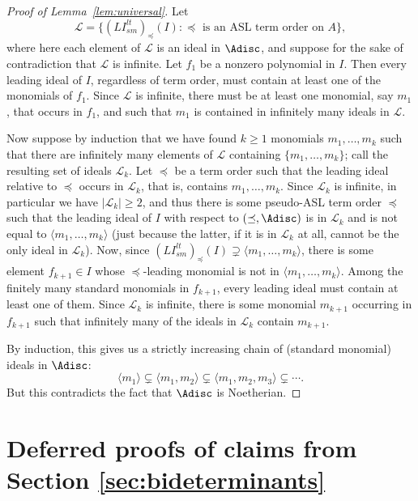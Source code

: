 \documentclass[11pt,reqno]{amsart}
\newcommand{\suchthat}{:}
\newcommand{\lismlt}{LI_{sm}^{lt}}
\theoremstyle{definition}
\numberwithin{equation}{section}
\begin{document}
\begin{proof}[Proof of Lemma~\ref{lem:universal}]
Let \[\mathcal{L} = \{ (\lismlt)_{\preceq}(I) \suchthat \preceq \text{ is an ASL term order on $A$} \},\] where here each element of $\mathcal{L}$ is an ideal in $\Adisc$, and suppose for the sake of contradiction that $\mathcal{L}$ is infinite. Let $f_1$ be a nonzero polynomial in $I$. Then every leading ideal of $I$, regardless of term order, must contain at least one of the monomials of $f_1$. Since $\mathcal{L}$ is infinite, there must be at least one monomial, say $m_1$, that occurs in $f_1$, and such that $m_1$ is contained in infinitely many ideals in $\mathcal{L}$. 

Now suppose by induction that we have found $k \geq 1$ monomials $m_1, \dotsc, m_k$ such that there are infinitely many elements of $\mathcal{L}$ containing $\{m_1, \dotsc, m_k\}$; call the resulting set of ideals $\mathcal{L}_k$. Let $\preceq$ be a term order such that the leading ideal relative to $\preceq$ occurs in $\mathcal{L}_k$, that is, contains $m_1, \dotsc, m_k$. Since $\mathcal{L}_k$ is infinite, in particular we have $|\mathcal{L}_k| \geq 2$, and thus there is some pseudo-ASL term order $\preceq$ such that the leading ideal of $I$ with respect to $(\preceq,\Adisc)$ is in $\mathcal{L}_k$ and is not equal to $\langle m_1, \dotsc, m_k \rangle$ (just because the latter, if it is in $\mathcal{L}_k$ at all, cannot be the only ideal in $\mathcal{L}_k$). Now, since $(\lismlt)_{\preceq}(I) \supsetneq \langle m_1, \dotsc, m_k \rangle$, there is some element $f_{k+1} \in I$ whose $\preceq$-leading monomial is not in $\langle m_1, \dotsc, m_k \rangle$. Among the finitely many standard monomials in $f_{k+1}$, every leading ideal must contain at least one of them. Since $\mathcal{L}_k$ is infinite, there is some monomial $m_{k+1}$ occurring in $f_{k+1}$ such that infinitely many of the ideals in $\mathcal{L}_k$ contain $m_{k+1}$. 

By induction, this gives us a strictly increasing chain of (standard monomial) ideals in $\Adisc$:
\[
\langle m_1 \rangle \subsetneq \langle m_1, m_2 \rangle \subsetneq \langle m_1, m_2, m_3 \rangle \subsetneq \dotsb.
\]
But this contradicts the fact that $\Adisc$ is Noetherian.
\end{proof}

\section{Deferred proofs of claims from Section \ref{sec:bideterminants}}
\label{sec:app:bideterminants}
\end{document}

